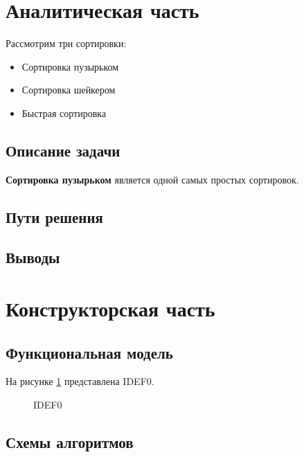 \documentclass[a4paper,12pt]{article}
\begin{document}
\newpage
\section{Аналитическая часть}

Рассмотрим три сортировки:

\begin{itemize}
    \item Сортировка пузырьком
    \item Сортировка шейкером
    \item Быстрая сортировка
\end{itemize}

\subsection{Описание задачи}

\textbf{Сортировка пузырьком} является одной самых простых сортировок.

\subsection{Пути решения}



\subsection{Выводы}

\newpage
\section{Конструкторская часть}

\subsection{Функциональная модель}

На рисунке \ref{img:IDEF0} представлена IDEF0.

\begin{figure}[h!]
    \caption{IDEF0}
    \label{img:IDEF0}
\end{figure}

\subsection{Схемы алгоритмов}
\end{document}
